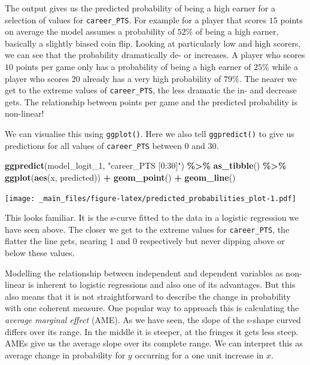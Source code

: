 \documentclass[
]{book}
\newenvironment{Shaded}{\begin{snugshade}}{\end{snugshade}}
\newcommand{\FunctionTok}[1]{\textcolor[rgb]{0.13,0.29,0.53}{\textbf{#1}}}
\newcommand{\NormalTok}[1]{#1}
\newcommand{\SpecialCharTok}[1]{\textcolor[rgb]{0.81,0.36,0.00}{\textbf{#1}}}
\newcommand{\StringTok}[1]{\textcolor[rgb]{0.31,0.60,0.02}{#1}}
\begin{document}
The output gives us the predicted probability of being a high earner for
a selection of values for \texttt{career\_PTS}. For example for a player that
scores \(15\) points on average the model assumes a probability of \(52\%\)
of being a high earner, basically a slightly biased coin flip. Looking at
particularly low and high scorers, we can see that the probability dramatically
de- or increases. A player who scores \(10\) points per game only has a
probability of being a high earner of \(25\%\) while a player who scores
\(20\) already has a very high probability of \(79\%\). The nearer we get
to the extreme values of \texttt{career\_PTS}, the less dramatic the in- and
decrease gets. The relationship between points per game and the
predicted probability is non-linear!

We can visualise this using \texttt{ggplot()}. Here we also tell \texttt{ggpredict()}
to give us predictions for all values of \texttt{career\_PTS} between \(0\) and
\(30\).

\begin{Shaded}
\begin{Highlighting}[]
\FunctionTok{ggpredict}\NormalTok{(model\_logit\_1, }\StringTok{"career\_PTS [0:30]"}\NormalTok{) }\SpecialCharTok{\%\textgreater{}\%}
  \FunctionTok{as\_tibble}\NormalTok{() }\SpecialCharTok{\%\textgreater{}\%} 
  \FunctionTok{ggplot}\NormalTok{(}\FunctionTok{aes}\NormalTok{(x, predicted)) }\SpecialCharTok{+}
  \FunctionTok{geom\_point}\NormalTok{() }\SpecialCharTok{+}
  \FunctionTok{geom\_line}\NormalTok{()}
\end{Highlighting}
\end{Shaded}

\texttt{[image: \_main\_files/figure-latex/predicted\_probabilities\_plot-1.pdf]}

This looks familiar. It is the s-curve fitted to the data in a logistic
regression we have seen above. The closer we get to the extreme values
for \texttt{career\_PTS}, the flatter the line gets, nearing \(1\) and \(0\)
respectively but never dipping above or below these values.

Modelling the relationship between independent and dependent variables
as non-linear is inherent to logistic regressions and also one of its
advantages. But this also means that it is not straightforward to
describe the change in probability with one coherent measure. One
popular way to approach this is calculating the
\emph{average marginal effect} (AME).
As we have seen, the slope of the s-shape curved differs
over its range. In the middle it is steeper, at the fringes it gets less
steep. AMEs give us the average slope over its complete range. We can
interpret this as average change in probability for \(y\) occurring for a
one unit increase in \(x\).
\end{document}
